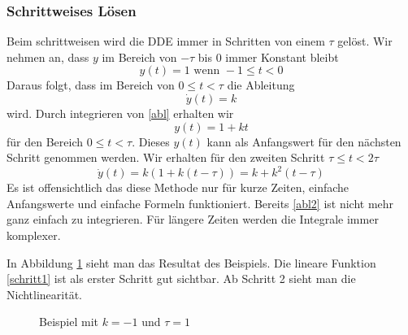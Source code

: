 \subsubsection{Schrittweises Lösen}
Beim schrittweisen wird die DDE immer in Schritten von einem $\tau$ gelöst.
Wir nehmen an, dass $y$ im Bereich von $-\tau$ bis $0$ immer Konstant bleibt
\begin{equation}
	y(t)=1 \text{ wenn } -1\le t<0
\end{equation}
Daraus folgt, dass im Bereich von $0\le t<\tau$ die Ableitung
\begin{equation}\label{abl}
	\dot{y}(t)=k
\end{equation}
wird. Durch integrieren von \eqref{abl} erhalten wir
\begin{equation}\label{schritt1}
	y(t)=1+kt
\end{equation}
für den Bereich $0\le t<\tau$. 
Dieses $y(t)$ kann als Anfangswert für den nächsten Schritt genommen werden.
Wir erhalten für den zweiten Schritt  $\tau\le t<2\tau$ 
\begin{equation}\label{abl2}
	\dot{y}(t)=k(1+k(t-\tau))=k+k^2(t-\tau)
\end{equation}
Es ist offensichtlich das diese Methode nur für kurze Zeiten, einfache Anfangswerte und einfache Formeln funktioniert. 
Bereits \eqref{abl2} ist nicht mehr ganz einfach zu integrieren. 
Für längere Zeiten werden die Integrale immer komplexer.

In Abbildung \ref{fig_bsp} sieht man das Resultat des Beispiels. 
Die lineare Funktion \eqref{schritt1} ist als erster Schritt gut sichtbar.
Ab Schritt 2 sieht man die Nichtlinearität. 
\begin{figure}
	\centering
	
	\caption{Beispiel mit $k=-1$ und $\tau=1$}
	\label{fig_bsp}
\end{figure}

